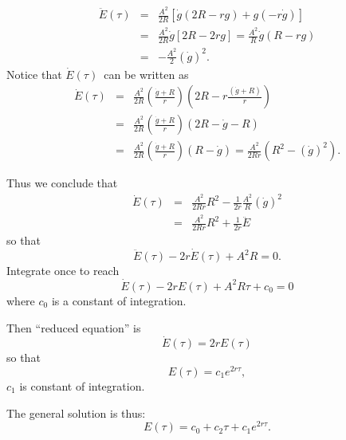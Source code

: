 \documentclass[12pt,compress,handout]{beamer}  %
\begin{document}
\begin{frame}

\begin{eqnarray*}
    \ddot{E}(\tau ) &=&\frac{A^{2}}{2R}[\dot{g}(2R-rg)+g(-r\dot{g})] \\
    &=&\frac{A^{2}}{2R}\dot{g}[2R-2rg]=\frac{A^{2}}{R}\dot{g}(R-rg) \\
    &=&-\frac{A^{2}}{2}(\dot{g})^{2}.
\end{eqnarray*}
Notice that $\dot{E}(\tau )$\ can be written as
\begin{eqnarray*}
    \dot{E}(\tau )
    &=&\frac{A^{2}}{2R}\left( \frac{\dot{g}+R}{r}\right)
        \left(2R-r\frac{(\dot{g}+R)}{r}\right)  \\
    &=&\frac{A^{2}}{2R}\left( \frac{\dot{g}+R}{r}\right) (2R-\dot{g}-R) \\
    &=&\frac{A^{2}}{2R}\left( \frac{\dot{g}+R}{r}\right) (R-\dot{g})
        =\frac{A^{2}}{2Rr}(R^{2}-(\dot{g})^{2}).
\end{eqnarray*}

\end{frame}


\begin{frame}

Thus we conclude that
\begin{eqnarray*}
    \dot{E}(\tau)
    &=& \frac{A^{2}}{2Rr}R^{2}
        - \frac{1}{2r}\frac{A^2}{R}(\dot{g})^{2}\\
    &=& \frac{A^{2}}{2Rr}R^{2} + \frac{1}{2r}\ddot{E}
\end{eqnarray*}
 so that
\begin{equation*}
    \ddot{E}(\tau ) - 2r\dot{E}(\tau ) + A^{2}R=0.
\end{equation*}
Integrate once to reach
\begin{equation*}
    \dot{E}(\tau ) - 2rE(\tau ) + A^{2}R\tau + c_{0}=0
\end{equation*}
where $c_0$ is a constant of integration.

\end{frame}


\begin{frame}

Then ``reduced equation'' is
\begin{equation*}
    \dot{E}(\tau ) = 2rE(\tau )
\end{equation*}
so that
\begin{equation*}
    E(\tau )
    =
    c_{1} e^{2r\tau },
\end{equation*}
$c_1$ is constant of integration.\bigskip

The general solution is thus:
\begin{equation*}
    E(\tau )
    =
    c_{0} + c_{2}\tau + c_{1}e^{2r\tau}.
\end{equation*}

\end{frame}
\end{document}
